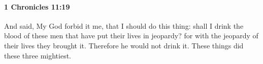 
		\paragraph{1 Chronicles 11:19} %
			\label{1CHRONICLES-11-19}

			And said, My God forbid it me, that I should do this thing: shall I drink the blood of these men that have put their lives in jeopardy? for with the jeopardy of their lives they brought it. Therefore he would not drink it. These things did these three mightiest.


